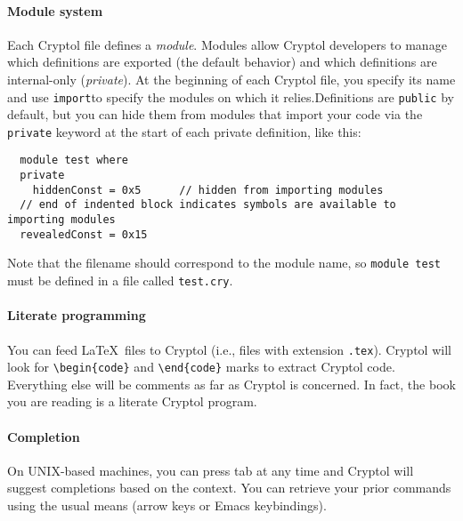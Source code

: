 \paragraph*{Module system}
Each Cryptol file defines a \textit{module}. Modules allow Cryptol
developers to manage which definitions are exported (the default
behavior) and which definitions are internal-only (\textit{private}). At
the beginning of each Cryptol file, you specify its name and use
\texttt{import}\indImport to specify the modules on which it
relies.\indModuleSystem  Definitions are \texttt{public} by default, but
you can hide them from modules that import your code via the
\texttt{private} keyword at the start of each private definition,\indPrivate
like this:
\begin{Verbatim}
  module test where
  private
    hiddenConst = 0x5      // hidden from importing modules
  // end of indented block indicates symbols are available to importing modules
  revealedConst = 0x15
\end{Verbatim}
Note that the filename should correspond to the module name, so
\texttt{module test} must be defined in a file called \texttt{test.cry}.



\paragraph*{Literate programming}
You can feed \LaTeX~files to Cryptol (i.e., files with extension
\texttt{.tex}).  Cryptol will look for \verb|\begin{code}| and
\verb|\end{code}| marks to extract Cryptol code.  Everything else
will be comments as far as Cryptol is concerned.  In fact, the book
you are reading is a literate Cryptol program.\indLiterateProgramming


\paragraph*{Completion}
On UNIX-based machines, you can press tab at any time and Cryptol will
suggest completions based on the context.  You can retrieve your
prior commands using the usual means (arrow keys or Emacs
keybindings).\indCompletion

